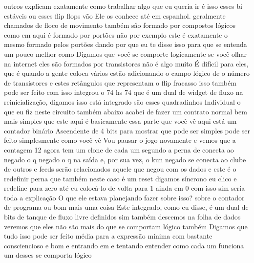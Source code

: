 \documentclass[oneside,11pt]{memoir} %
\begin{document}
outros explicam exatamente como  trabalhar algo que eu queria ir é isso  esses bi estáveis ou esses flip flops vão  Ele os conhece até em espanhol.  geralmente chamados de floco de movimento também são  formado por compostos lógicos como em  aqui é formado por  portões não por exemplo  este é exatamente o mesmo  formado pelos portões dando  por que eu te disse isso  para que se entenda um pouco melhor como  Digamos que você se comporte logicamente  se você olhar na internet eles são formados  por transistores não é algo muito  É difícil para eles, que é quando a gente coloca  vários estão adicionando o campo lógico de  o número de transistores e estes  retângulos que representam o flip  fracasso  isso também pode ser feito com isso  integrou o 74 hs 74 que é um dual de  widget de fluxo na reinicialização, digamos isso  está integrado são esses quadradinhos  Individual  o que eu fiz  neste circuito também abaixo  acabei de fazer um contrato normal  bem mais simples que este  aqui é basicamente essa parte que você vê  aqui está um contador binário  Ascendente de 4 bits para mostrar que  pode ser simples pode ser feito  simplesmente como você vê  Vou pausar o jogo novamente e  vemos que a contagem 12 agora tem um clone  de cada um segundo a perna de conecta  ao negado o q negado o q na saída  e, por sua vez, o kun negado se conecta ao  clube de outros e feeds serão relacionados  aquele que negou com os dados e este é o  redefinir perna que também neste caso  é um reset  digamos síncrono eu clico e  redefine para zero  até eu colocá-lo de volta para 1  ainda em 0  com isso sim seria toda a explicação  O que ele estava planejando fazer sobre isso?  sobre o contador de programa ou bom  mais uma coisa  Este integrado, como eu disse, é um dual  de bits de tanque de fluxo livre definidos sim  também descemos na folha de dados  veremos que eles não são mais do que se comportam  lógico também  Digamos que tudo isso pode ser feito  média para a expressão mínima com  bastante consciencioso e bom e entrando em  e tentando entender como cada um funciona  um desses se comporta lógico

\end{document}
